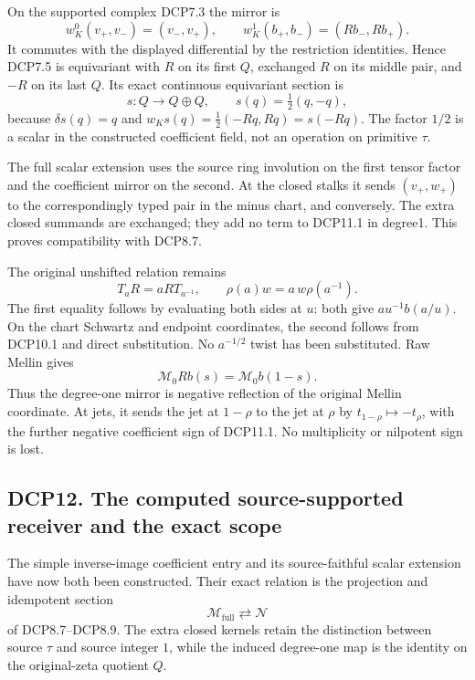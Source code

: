 On the supported complex DCP7.3 the mirror is \[
 w_K^0(v_+,v_-)=(v_-,v_+),\qquad
 w_K^1(b_+,b_-)=(Rb_-,Rb_+).
\tag{DCP11.2}
\] It commutes with the displayed differential by the restriction
identities. Hence DCP7.5 is equivariant with \(R\) on its first \(Q\),
exchanged \(R\) on its middle pair, and \(-R\) on its last \(Q\). Its
exact continuous equivariant section is \[
 s:Q\to Q\oplus Q,\qquad s(q)=\tfrac12(q,-q),
\tag{DCP11.3}
\] because \(\delta s(q)=q\) and \(w_Ks(q)=\tfrac12(-Rq,Rq)=s(-Rq)\).
The factor \(1/2\) is a scalar in the constructed coefficient field, not
an operation on primitive \(\tau\).

The full scalar extension uses the source ring involution on the first
tensor factor and the coefficient mirror on the second. At the closed
stalks it sends \((v_+,w_+)\) to the correspondingly typed pair in the
minus chart, and conversely. The extra closed summands are exchanged;
they add no term to DCP11.1 in degree1. This proves compatibility with
DCP8.7.

The original unshifted relation remains \[
 T_a R=a R T_{a^{-1}},
\qquad \rho(a)w=a\,w\rho(a^{-1}).
\tag{DCP11.4}
\] The first equality follows by evaluating both sides at \(u\): both
give \(a u^{-1}b(a/u)\). On the chart Schwartz and endpoint coordinates,
the second follows from DCP10.1 and direct substitution. No \(a^{-1/2}\)
twist has been substituted. Raw Mellin gives \[
 \mathcal M_0Rb(s)=\mathcal M_0b(1-s).
\tag{DCP11.5}
\] Thus the degree-one mirror is negative reflection of the original
Mellin coordinate. At jets, it sends the jet at \(1-\rho\) to the jet at
\(\rho\) by \(t_{1-\rho}\mapsto-t_\rho\), with the further negative
coefficient sign of DCP11.1. No multiplicity or nilpotent sign is lost.

\subsection{DCP12. The computed source-supported receiver and the exact
scope}\label{dcp12.-the-computed-source-supported-receiver-and-the-exact-scope}

The simple inverse-image coefficient entry and its source-faithful
scalar extension have now both been constructed. Their exact relation is
the projection and idempotent section \[
 \mathcal M_{\mathrm{full}}\rightleftarrows\mathcal N
\] of DCP8.7--DCP8.9. The extra closed kernels retain the distinction
between source \(\tau\) and source integer \(1\), while the induced
degree-one map is the identity on the original-zeta quotient \(Q\).

